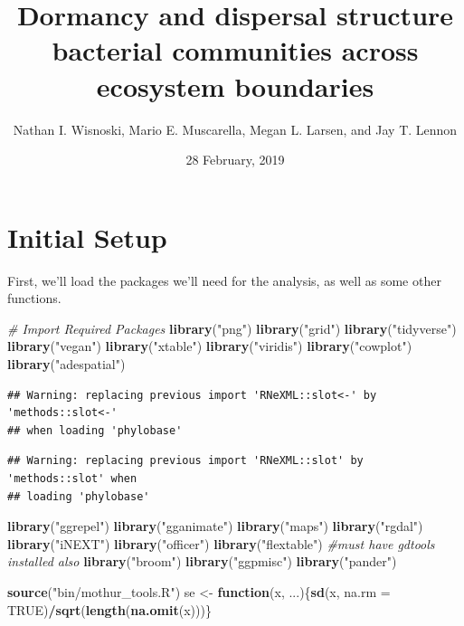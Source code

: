 \documentclass[]{article}
\title{Dormancy and dispersal structure bacterial communities across ecosystem
boundaries}
\author{Nathan I. Wisnoski, Mario E. Muscarella, Megan L. Larsen, and Jay T.
Lennon}
\date{28 February, 2019}
\newenvironment{Shaded}{\begin{snugshade}}{\end{snugshade}}
\newcommand{\KeywordTok}[1]{\textcolor[rgb]{0.13,0.29,0.53}{\textbf{#1}}}
\newcommand{\DataTypeTok}[1]{\textcolor[rgb]{0.13,0.29,0.53}{#1}}
\newcommand{\StringTok}[1]{\textcolor[rgb]{0.31,0.60,0.02}{#1}}
\newcommand{\CommentTok}[1]{\textcolor[rgb]{0.56,0.35,0.01}{\textit{#1}}}
\newcommand{\OtherTok}[1]{\textcolor[rgb]{0.56,0.35,0.01}{#1}}
\newcommand{\ControlFlowTok}[1]{\textcolor[rgb]{0.13,0.29,0.53}{\textbf{#1}}}
\newcommand{\OperatorTok}[1]{\textcolor[rgb]{0.81,0.36,0.00}{\textbf{#1}}}
\newcommand{\NormalTok}[1]{#1}
\begin{document}
\maketitle

\section{Initial Setup}\label{initial-setup}

First, we'll load the packages we'll need for the analysis, as well as
some other functions.

\begin{Shaded}
\begin{Highlighting}[]
\CommentTok{# Import Required Packages}
\KeywordTok{library}\NormalTok{(}\StringTok{"png"}\NormalTok{)}
\KeywordTok{library}\NormalTok{(}\StringTok{"grid"}\NormalTok{)}
\KeywordTok{library}\NormalTok{(}\StringTok{"tidyverse"}\NormalTok{)   }
\KeywordTok{library}\NormalTok{(}\StringTok{"vegan"}\NormalTok{)}
\KeywordTok{library}\NormalTok{(}\StringTok{"xtable"}\NormalTok{)}
\KeywordTok{library}\NormalTok{(}\StringTok{"viridis"}\NormalTok{)}
\KeywordTok{library}\NormalTok{(}\StringTok{"cowplot"}\NormalTok{)}
\KeywordTok{library}\NormalTok{(}\StringTok{"adespatial"}\NormalTok{)}
\end{Highlighting}
\end{Shaded}

\begin{verbatim}
## Warning: replacing previous import 'RNeXML::slot<-' by 'methods::slot<-'
## when loading 'phylobase'
\end{verbatim}

\begin{verbatim}
## Warning: replacing previous import 'RNeXML::slot' by 'methods::slot' when
## loading 'phylobase'
\end{verbatim}

\begin{Shaded}
\begin{Highlighting}[]
\KeywordTok{library}\NormalTok{(}\StringTok{"ggrepel"}\NormalTok{)}
\KeywordTok{library}\NormalTok{(}\StringTok{"gganimate"}\NormalTok{)}
\KeywordTok{library}\NormalTok{(}\StringTok{"maps"}\NormalTok{)}
\KeywordTok{library}\NormalTok{(}\StringTok{"rgdal"}\NormalTok{)}
\KeywordTok{library}\NormalTok{(}\StringTok{"iNEXT"}\NormalTok{)}
\KeywordTok{library}\NormalTok{(}\StringTok{"officer"}\NormalTok{)}
\KeywordTok{library}\NormalTok{(}\StringTok{"flextable"}\NormalTok{) }\CommentTok{#must have gdtools installed also}
\KeywordTok{library}\NormalTok{(}\StringTok{"broom"}\NormalTok{)}
\KeywordTok{library}\NormalTok{(}\StringTok{"ggpmisc"}\NormalTok{)}
\KeywordTok{library}\NormalTok{(}\StringTok{"pander"}\NormalTok{)}

\KeywordTok{source}\NormalTok{(}\StringTok{"bin/mothur_tools.R"}\NormalTok{)}
\NormalTok{se <-}\StringTok{ }\ControlFlowTok{function}\NormalTok{(x, ...)\{}\KeywordTok{sd}\NormalTok{(x, }\DataTypeTok{na.rm =} \OtherTok{TRUE}\NormalTok{)}\OperatorTok{/}\KeywordTok{sqrt}\NormalTok{(}\KeywordTok{length}\NormalTok{(}\KeywordTok{na.omit}\NormalTok{(x)))\}}
\end{Highlighting}
\end{Shaded}
\end{document}

